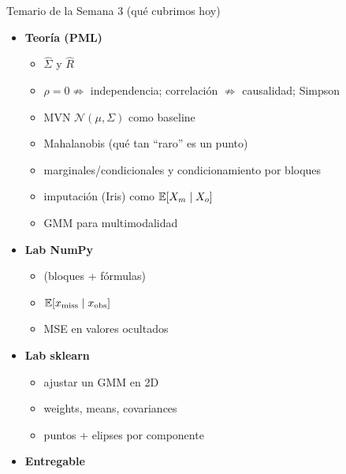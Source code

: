 \begin{frame}{Temario de la Semana 3 (qué cubrimos hoy)}
\begin{itemize}
  \item \textbf{Teoría (PML)}
  \begin{itemize}\small
    \item {} \(\hat{\Sigma}\) y \(\hat{R}\) \hfill {}
    \item {} \(\rho=0\not\Rightarrow\) independencia; correlación \(\not\Rightarrow\) causalidad; Simpson \hfill {}
    \item {} MVN \(\mathcal{N}(\mu,\Sigma)\) como baseline \hfill {}
    \item {} Mahalanobis (qué tan “raro” es un punto) \hfill {}
    \item {} marginales/condicionales y condicionamiento por bloques \hfill {}
    \item {} imputación (Iris) como \(\mathbb{E}[X_m\mid X_o]\) \hfill {}
    \item {} GMM para multimodalidad \hfill {}
  \end{itemize}
  \item \textbf{Lab NumPy}
  \begin{itemize}\small
    \item {} (bloques + fórmulas)
    \item {} \(\mathbb{E}[x_{\text{miss}}\mid x_{\text{obs}}]\)
    \item {} MSE en valores ocultados
  \end{itemize}
  \item \textbf{Lab sklearn}
  \begin{itemize}\small
    \item {} ajustar un GMM en 2D
    \item {} weights, means, covariances
    \item {} puntos + elipses por componente
  \end{itemize}
  \item \textbf{Entregable}
\end{itemize}
\end{frame}

